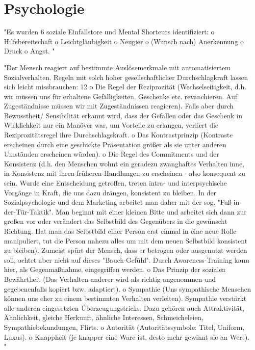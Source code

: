 \chapter{Psychologie}

"Es wurden 6 soziale Einfallstore und Mental Shortcuts identifiziert:
o Hilfsbereitschaft
o Leichtgläubigkeit
o Neugier
o (Wunsch nach) Anerkennung
o Druck
o Angst.
"\cite{10_bka}

"Der Mensch reagiert auf bestimmte Auslösemerkmale mit automatisiertem Sozialverhalten. Regeln mit solch hoher gesellschaftlicher Durchschlagkraft lassen sich leicht
missbrauchen:
12
o Die Regel der Reziprozität (Wechselseitigkeit, d.h. wir müssen uns für erhaltene Gefälligkeiten, Geschenke etc. revanchieren. Auf Zugeständnisse müssen wir mit Zugeständnissen reagieren). Falls aber durch Bewusstheit/ Sensibilität erkannt wird, dass der Gefallen oder das Geschenk in Wirklichkeit nur
ein Manöver war, um Vorteile zu erlangen, verliert die Reziprozitätsregel ihre
Durchschlagskraft.
o Das Kontrastprinzip (Kontraste erscheinen durch eine geschickte Präsentation
größer als sie unter anderen Umständen erscheinen würden).
o Die Regel des Commitments und der Konsistenz (d.h. den Menschen wohnt
ein geradezu zwanghaftes Verhalten inne, in Konsistenz mit ihren früheren
Handlungen zu erscheinen - also konsequent zu sein. Wurde eine Entscheidung getroffen, treten intra- und interpsychische Vorgänge in Kraft, die uns
dazu drängen, konsistent zu bleiben. In der Sozialpsychologie und dem Marketing arbeitet man daher mit der sog. "Fuß-in-der-Tür-Taktik". Man beginnt
mit einer kleinen Bitte und arbeitet sich dann zur großen vor oder verändert
das Selbstbild des Gegenübers in die gewünscht Richtung. Hat man das
Selbstbild einer Person erst einmal in eine neue Rolle manipuliert, tut die Person nahezu alles um mit dem neuen Selbstbild konsistent zu bleiben). Zumeist spürt der Mensch, dass er betrogen oder ausgenutzt werden soll, achtet
aber nicht auf dieses "Bauch-Gefühl". Durch Awareness-Training kann hier,
als Gegenmaßnahme, eingegriffen werden.
o Das Prinzip der sozialen Bewährtheit (Das Verhalten anderer wird als richtig
angenommen und gegebenenfalls kopiert bzw. adaptiert).
o Sympathie (Uns sympathische Menschen können uns eher zu einem bestimmten Verhalten verleiten). Sympathie verstärkt alle anderen eingesetzten
Überzeugungstricks. Dazu gehören auch Attraktivität, Ähnlichkeit, gleiche
Herkunft, ähnliche Interessen, Schmeicheleien, Sympathiebekundungen, Flirts.
o Autorität (Autoritätssymbole: Titel, Uniform, Luxus).
o Knappheit (je knapper eine Ware ist, desto mehr gewinnt sie an Wert). "\cite{10_bka}

